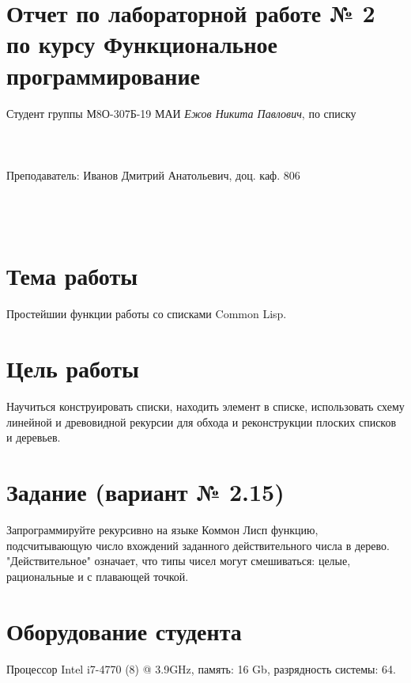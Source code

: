 \documentclass[12pt]{article}
\begin{document}
\section*{Отчет по лабораторной работе № 2 \\
по курсу \guillemotleft Функциональное программирование\guillemotright}
\begin{flushright}
Студент группы М8О-307Б-19 МАИ \textit{Ежов Никита Павлович},  по списку \\
 \\
 \\
\ \\
Преподаватель: Иванов Дмитрий Анатольевич, доц. каф. 806 \\
 \\
 \\
 \\

\end{flushright}

\section{Тема работы}
Простейшии функции работы со списками Common Lisp.

\section{Цель работы}
Научиться конструировать списки, находить элемент в списке, использовать схему линейной и древовидной рекурсии для обхода и реконструкции
плоских списков и деревьев.

\section{Задание (вариант № 2.15)}
Запрограммируйте рекурсивно на языке Коммон Лисп функцию, подсчитывающую число вхождений заданного действительного числа в дерево. 
"Действительное" означает, что типы чисел могут смешиваться: целые, рациональные и с плавающей точкой.

\section{Оборудование студента}
Процессор Intel i7-4770 (8) @ 3.9GHz, память: 16 Gb, разрядность системы: 64.
\end{document}
